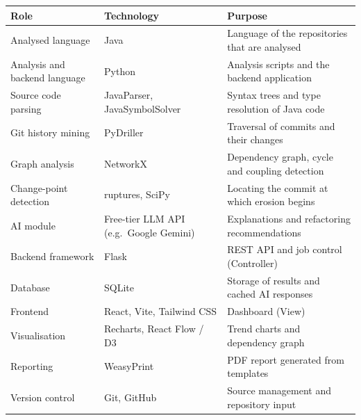 \documentclass[12pt,a4paper]{article}
\begin{document}
\begin{table}[H]
\centering
\renewcommand{\arraystretch}{1.5}
\setlength{\tabcolsep}{6pt}
 
\begin{tabular}{|L{1.3in}|L{2.0in}|L{2.05in}|}
\hline
\textbf{Role} & \textbf{Technology} & \textbf{Purpose} \\
\hline
Analysed language & Java & Language of the repositories that are analysed \\
\hline
Analysis and backend language & Python & Analysis scripts and the backend application \\
\hline
Source code parsing & JavaParser, JavaSymbolSolver & Syntax trees and type resolution of Java code \\
\hline
Git history mining & PyDriller & Traversal of commits and their changes \\
\hline
Graph analysis & NetworkX & Dependency graph, cycle and coupling detection \\
\hline
Change-point detection & ruptures, SciPy & Locating the commit at which erosion begins \\
\hline
AI module & Free-tier LLM API (e.g.\ Google Gemini) & Explanations and refactoring recommendations \\
\hline
Backend framework & Flask & REST API and job control (Controller) \\
\hline
Database & SQLite & Storage of results and cached AI responses \\
\hline
Frontend & React, Vite, Tailwind CSS & Dashboard (View) \\
\hline
Visualisation & Recharts, React Flow / D3 & Trend charts and dependency graph \\
\hline
Reporting & WeasyPrint & PDF report generated from templates \\
\hline
Version control & Git, GitHub & Source management and repository input \\
\hline
\end{tabular}
\end{table}
 
\end{document}
